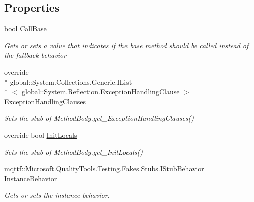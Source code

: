 \subsection*{Properties}
\begin{DoxyCompactItemize}
\item 
bool \hyperlink{class_system_1_1_reflection_1_1_fakes_1_1_stub_method_body_a09b0a63c100b8145706a73fa740afc9e}{Call\-Base}
\begin{DoxyCompactList}\small\item\em Gets or sets a value that indicates if the base method should be called instead of the fallback behavior\end{DoxyCompactList}\item 
override \\*
global\-::\-System.\-Collections.\-Generic.\-I\-List\\*
$<$ global\-::\-System.\-Reflection.\-Exception\-Handling\-Clause $>$ \hyperlink{class_system_1_1_reflection_1_1_fakes_1_1_stub_method_body_ac2cdb81048b3b44327038e964fe1f2de}{Exception\-Handling\-Clauses}
\begin{DoxyCompactList}\small\item\em Sets the stub of Method\-Body.\-get\-\_\-\-Exception\-Handling\-Clauses()\end{DoxyCompactList}\item 
override bool \hyperlink{class_system_1_1_reflection_1_1_fakes_1_1_stub_method_body_a0e0e54fe2e5fb0233edfb8f7fe3f8dc7}{Init\-Locals}
\begin{DoxyCompactList}\small\item\em Sets the stub of Method\-Body.\-get\-\_\-\-Init\-Locals()\end{DoxyCompactList}\item 
mqttf\-::\-Microsoft.\-Quality\-Tools.\-Testing.\-Fakes.\-Stubs.\-I\-Stub\-Behavior \hyperlink{class_system_1_1_reflection_1_1_fakes_1_1_stub_method_body_a59cf4caa5e120abe0a50ebd8552f4612}{Instance\-Behavior}
\begin{DoxyCompactList}\small\item\em Gets or sets the instance behavior.\end{DoxyCompactList}\item 

\end{DoxyCompactItemize}
